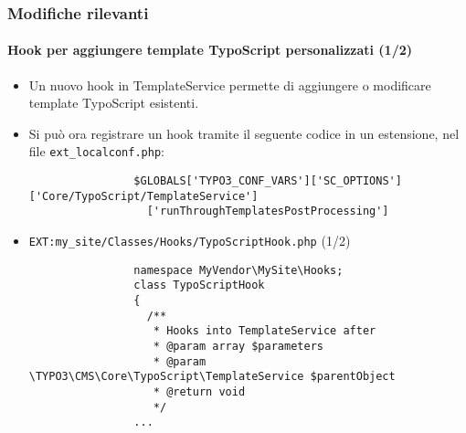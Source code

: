\begin{frame}[fragile]
	\frametitle{Modifiche rilevanti}
	\framesubtitle{Hook per aggiungere template TypoScript personalizzati (1/2)}

	\lstset{basicstyle=\tiny\ttfamily}

	\begin{itemize}
		\item Un nuovo hook in TemplateService permette di aggiungere o modificare template TypoScript esistenti.

		\item Si può ora registrare un hook tramite il seguente codice in un estensione, nel file \texttt{ext\_localconf.php}:

			\begin{lstlisting}
				$GLOBALS['TYPO3_CONF_VARS']['SC_OPTIONS']['Core/TypoScript/TemplateService']
				  ['runThroughTemplatesPostProcessing']
			\end{lstlisting}

		\item \texttt{EXT:my\_site/Classes/Hooks/TypoScriptHook.php} (1/2)

			\begin{lstlisting}
				namespace MyVendor\MySite\Hooks;
				class TypoScriptHook
				{
				  /**
				   * Hooks into TemplateService after
				   * @param array $parameters
				   * @param \TYPO3\CMS\Core\TypoScript\TemplateService $parentObject
				   * @return void
				   */
				...
			\end{lstlisting}

	\end{itemize}

\end{frame}


